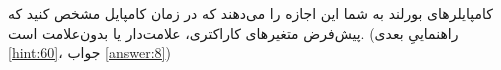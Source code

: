 \section{}
\paragraph{}\label{hint:30}
کامپایلرهای بورلند به شما این اجازه را می‌دهند که در زمان کامپایل مشخص کنید که پیش‌فرض متغیرهای کاراکتری، علامت‌دار یا بدون‌علامت است. (راهنماییِ بعدی \ref{hint:60}، جواب \ref{answer:8})